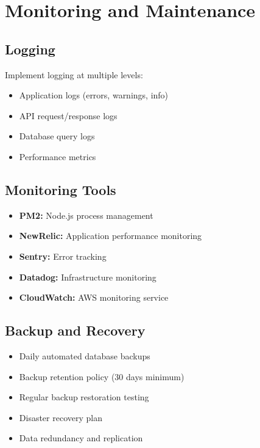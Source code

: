 \section{Monitoring and Maintenance}

\subsection{Logging}

Implement logging at multiple levels:

\begin{itemize}
    \item Application logs (errors, warnings, info)
    \item API request/response logs
    \item Database query logs
    \item Performance metrics
\end{itemize}

\subsection{Monitoring Tools}

\begin{itemize}
    \item \textbf{PM2:} Node.js process management
    \item \textbf{NewRelic:} Application performance monitoring
    \item \textbf{Sentry:} Error tracking
    \item \textbf{Datadog:} Infrastructure monitoring
    \item \textbf{CloudWatch:} AWS monitoring service
\end{itemize}

\subsection{Backup and Recovery}

\begin{itemize}
    \item Daily automated database backups
    \item Backup retention policy (30 days minimum)
    \item Regular backup restoration testing
    \item Disaster recovery plan
    \item Data redundancy and replication
\end{itemize}

